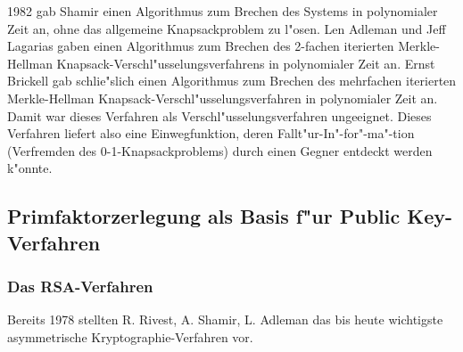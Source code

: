 1982 gab  Shamir \cite{Shamir1982} einen Algorithmus zum
Brechen des Systems in polynomialer Zeit an, ohne das allgemeine
Knapsackproblem zu l"osen. Len  Adleman
\cite{Adleman1982} und Jeff Lagarias 
\cite{Lagarias1983} gaben einen Algorithmus zum Brechen des 2-fachen
iterierten Merkle-Hellman Knapsack-Verschl"usselungsverfahrens in
polynomialer Zeit an. Ernst Brickell 
\cite{Brickell1985} gab schlie"slich einen Algorithmus zum Brechen des
mehrfachen iterierten Merkle-Hellman Knapsack-Verschl"usselungsverfahren in
polynomialer Zeit an. Damit war dieses Verfahren als
Verschl"usselungsverfahren ungeeignet. Dieses Verfahren liefert also eine
Einwegfunktion, deren Fallt"ur-In"-for"-ma"-tion (Verfremden des
0-1-Knapsackproblems) durch einen Gegner entdeckt werden k"onnte.


\subsection{Primfaktorzerlegung als Basis f"ur Public Key-Verfahren}


\subsubsection[Das RSA-Verfahren]
{Das RSA-Verfahren\footnotemark}
 \hypertarget{RSAVerfahren}{} 

Bereits 1978 stellten R.  Rivest,  A. Shamir,   L. Adleman \cite{RSA1978} das bis heute wichtigste 
asymmetrische Kryptographie-Verfahren vor.  \par

\begin{center}
\end{center}

